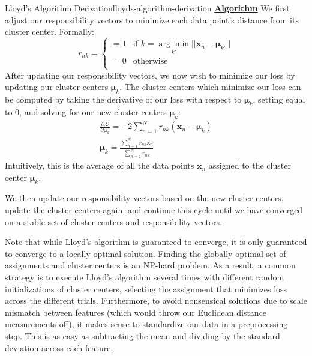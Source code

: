 \begin{derivation}{Lloyd's Algorithm Derivation}{lloyds-algorithm-derivation}
	\underline{\textbf{Algorithm}} \newline
	We first adjust our responsibility vectors to minimize each data point's distance from its cluster center. Formally:
	\begin{equation} \label{responsibility-vector-update}
		r_{nk} = \begin{cases}
		 	= 1 & \text{if $k = \underset{k'}{\arg\min} ||\textbf{x}_{n} - \boldsymbol{\mu}_{k'}||$} \\
			= 0 & \text{otherwise} \\
		\end{cases}
	\end{equation}
	After updating our responsibility vectors, we now wish to minimize our loss by updating our cluster centers $\boldsymbol{\mu}_{k}$. The cluster centers which minimize our loss can be computed by taking the derivative of our loss with respect to $\boldsymbol{\mu}_{k}$, setting equal to 0, and solving for our new cluster centers $\boldsymbol{\mu}_{k}$:
	\begin{equation} \label{update-cluster-centers}
		\begin{aligned}
			\frac{\partial \mathcal{L}}{\partial \boldsymbol{\mu}_{k}} = -2 \sum_{n=1}^{N} r_{nk} (\textbf{x}_{n} - \boldsymbol{\mu}_{k}) \\
			\boldsymbol{\mu}_{k} = \frac{\sum_{n=1}^{N} r_{nk} \textbf{x}_{n}}{\sum_{n=1}^{N} r_{nk}}
		\end{aligned}
	\end{equation}
	Intuitively, this is the average of all the data points $\textbf{x}_{n}$ assigned to the cluster center $\boldsymbol{\mu}_{k}$. \newline

	We then update our responsibility vectors based on the new cluster centers, update the cluster centers again, and continue this cycle until we have converged on a stable set of cluster centers and responsibility vectors.
\end{derivation}

Note that while Lloyd's algorithm is guaranteed to converge, it is only guaranteed to converge to a locally optimal solution. Finding the globally optimal set of assignments and cluster centers is an NP-hard problem. As a result, a common strategy is to execute Lloyd's algorithm several times with different random initializations of cluster centers, selecting the assignment that minimizes loss across the different trials. Furthermore, to avoid nonsensical solutions due to scale mismatch between features (which would throw our Euclidean distance measurements off), it makes sense to standardize our data in a preprocessing step. This is as easy as subtracting the mean and dividing by the standard deviation across each feature.

